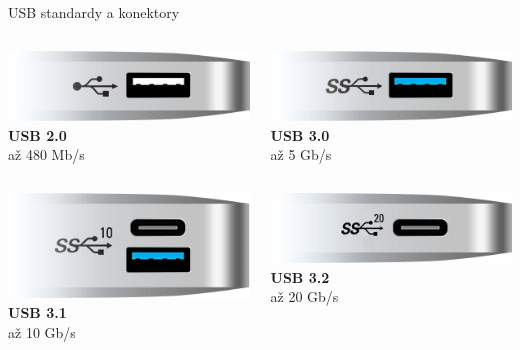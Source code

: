 \documentclass[aspectratio=43]{beamer}
\begin{document}
\begin{frame}{USB standardy a konektory}
	\begin{columns}[t]
		\begin{column}{0.5\textwidth}
			\includegraphics[width=0.6\linewidth]{extrahovane_obrazky/img_3_page22_0.png}\\
			\centering\textbf{USB 2.0}\\
			až 480 Mb/s
		\end{column}
		\begin{column}{0.5\textwidth}
			\includegraphics[width=0.6\linewidth]{extrahovane_obrazky/img_3_page22_1.png}\\
			\centering\textbf{USB 3.0}\\
			až 5 Gb/s
		\end{column}
	\end{columns}
	
	\vspace{0.5cm}
	
	\begin{columns}[t]
		\begin{column}{0.5\textwidth}
			\includegraphics[width=0.6\linewidth]{extrahovane_obrazky/img_3_page22_2.png}\\
			\centering\textbf{USB 3.1}\\
			až 10 Gb/s
		\end{column}
		\begin{column}{0.5\textwidth}
			\includegraphics[width=0.6\linewidth]{extrahovane_obrazky/img_3_page22_3.jpeg}\\
			\centering\textbf{USB 3.2}\\
			až 20 Gb/s
		\end{column}
	\end{columns}
	

\end{frame}
\end{document}
